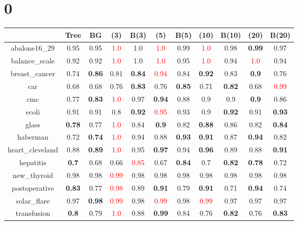 \documentclass{article}%
\begin{document}
%
\normalsize%
\section*{0}%
\begin{tabular}{c|cccccccccc}%
\hline%
&Tree&BG&(3)&B(3)&(5)&B(5)&(10)&B(10)&(20)&B(20)\\%
\hline%
abalone16\_29&0.95&0.95&\textcolor{red}{ 
1.0
}&1.0&\textcolor{red}{ 
1.0
}&0.99&\textcolor{red}{ 
1.0
}&0.98&\textbf{0.99}&0.97\\%
\hline%
balance\_scale&0.92&0.92&\textcolor{red}{ 
1.0
}&1.0&\textcolor{red}{ 
1.0
}&0.95&\textcolor{red}{ 
1.0
}&0.94&\textcolor{red}{ 
1.0
}&0.94\\%
\hline%
breast\_cancer&0.74&\textbf{0.86}&0.81&\textbf{0.84}&\textcolor{red}{ 
0.94
}&0.84&\textbf{0.92}&0.83&\textbf{0.9}&0.76\\%
\hline%
car&0.68&0.68&0.76&\textbf{0.83}&0.76&\textbf{0.85}&0.71&\textbf{0.82}&0.68&\textcolor{red}{ 
0.99
}\\%
\hline%
cmc&0.77&\textbf{0.83}&\textcolor{red}{ 
1.0
}&0.97&\textbf{0.94}&0.88&0.9&0.9&\textbf{0.9}&0.86\\%
\hline%
ecoli&0.91&0.91&0.8&\textbf{0.92}&\textcolor{red}{ 
0.95
}&0.93&0.9&\textbf{0.92}&0.91&\textbf{0.93}\\%
\hline%
glass&\textbf{0.78}&0.77&\textcolor{red}{ 
1.0
}&0.84&\textbf{0.9}&0.82&\textbf{0.88}&0.86&0.82&\textbf{0.84}\\%
\hline%
haberman&0.72&\textbf{0.74}&\textcolor{red}{ 
1.0
}&0.94&0.88&\textbf{0.93}&\textbf{0.91}&0.87&\textbf{0.94}&0.82\\%
\hline%
heart\_cleveland&0.88&\textbf{0.89}&\textcolor{red}{ 
1.0
}&0.95&\textbf{0.97}&0.94&\textbf{0.96}&0.89&0.88&\textbf{0.91}\\%
\hline%
hepatitis&\textbf{0.7}&0.68&0.66&\textcolor{red}{ 
0.85
}&0.67&\textbf{0.84}&0.7&\textbf{0.82}&\textbf{0.78}&0.72\\%
\hline%
new\_thyroid&0.98&0.98&\textcolor{red}{ 
0.99
}&0.98&0.98&0.98&0.98&0.98&0.98&0.98\\%
\hline%
postoperative&\textbf{0.83}&0.77&\textcolor{red}{ 
0.98
}&0.89&\textbf{0.91}&0.79&\textbf{0.91}&0.71&\textbf{0.94}&0.74\\%
\hline%
solar\_flare&0.97&\textbf{0.98}&\textcolor{red}{ 
0.99
}&0.98&\textcolor{red}{ 
0.99
}&0.98&\textcolor{red}{ 
0.99
}&0.97&0.97&0.97\\%
\hline%
transfusion&\textbf{0.8}&0.79&\textcolor{red}{ 
1.0
}&0.88&\textbf{0.99}&0.84&0.76&\textbf{0.82}&0.76&\textbf{0.83}\\%

\end{tabular}
\end{document}

